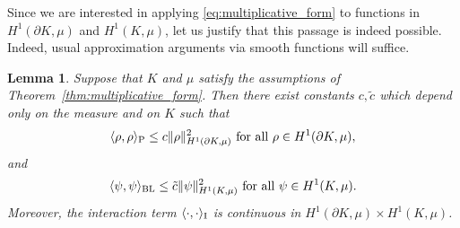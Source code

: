 \documentclass[a4paper, 11pt]{article}
\newtheorem{lemma}[theorem]{Lemma}
\theoremstyle{definition}
\begin{document}
Since we are interested in applying \eqref{eq:multiplicative_form} to functions in $H^{1}(\partial K,\mu)$ and $H^{1}(K,\mu)$, let us justify that this passage is indeed possible. Indeed, usual approximation arguments via smooth functions will suffice. 
\begin{lemma}\label{lem:continuity_both_forms}
    Suppose that $K$ and $\mu$ satisfy the assumptions of Theorem~\ref{thm:multiplicative_form}. Then there exist constants $c,\tilde{c}$ which depend only on the measure and on $K$ such that
    \begin{equation}\label{eq:continuity_poincare}
    \langle \rho ,\rho \rangle_{\rm P} \leq c\|\rho\|^2_{H^{1}(\partial K,\mu)} \,\, \text{for all} \,\, \rho \in H^{1}(\partial K,\mu),
    \end{equation}
    and 
    \begin{equation}\label{eq:continuity_BL}
        \langle \psi, \psi \rangle_{\rm BL} 
        \leq  \tilde{c} \|\psi\|^2_{H^{1}(K,\mu)} \,\, \text{for all} \,\,\psi \in H^1(K,\mu).
    \end{equation}
Moreover, the interaction term $\langle \cdot, \cdot \rangle_{\rm I}$ is continuous in $H^{1}(\partial K,\mu)\times H^{1}(K,\mu)$.    
\end{lemma}
\end{document}
